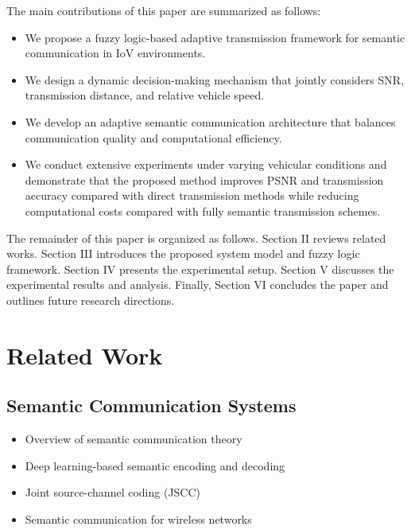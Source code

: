 \documentclass[lettersize,journal]{IEEEtran}
\begin{document}
The main contributions of this paper are summarized as follows:
\begin{itemize}
    \item We propose a fuzzy logic-based adaptive transmission framework for semantic communication in IoV environments.
    
    \item We design a dynamic decision-making mechanism that jointly considers SNR, transmission distance, and relative vehicle speed.
    
    \item We develop an adaptive semantic communication architecture that balances communication quality and computational efficiency.
    
    \item We conduct extensive experiments under varying vehicular conditions and demonstrate that the proposed method improves PSNR and transmission accuracy compared with direct transmission methods while reducing computational costs compared with fully semantic transmission schemes.
\end{itemize}

The remainder of this paper is organized as follows. Section II reviews related works. Section III introduces the proposed system model and fuzzy logic framework. Section IV presents the experimental setup. Section V discusses the experimental results and analysis. Finally, Section VI concludes the paper and outlines future research directions.

\section{Related Work}

\subsection{Semantic Communication Systems}

\begin{itemize}
    \item Overview of semantic communication theory
    \item Deep learning-based semantic encoding and decoding
    \item Joint source-channel coding (JSCC)
    \item Semantic communication for wireless networks
\end{itemize}
\end{document}
